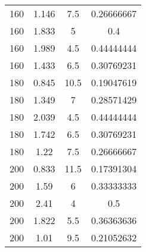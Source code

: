 \begin{table}[H]
\begin{tabular}{@{}cccc@{}}
    160           & 1.146     & 7.5                   & 0.26666667              \\
    160           & 1.833     & 5                     & 0.4                     \\
    160           & 1.989     & 4.5                   & 0.44444444              \\
    160           & 1.433     & 6.5                   & 0.30769231              \\
    180           & 0.845     & 10.5                  & 0.19047619              \\
    180           & 1.349     & 7                     & 0.28571429              \\
    180           & 2.039     & 4.5                   & 0.44444444              \\
    180           & 1.742     & 6.5                   & 0.30769231              \\
    180           & 1.22      & 7.5                   & 0.26666667              \\
    200           & 0.833     & 11.5                  & 0.17391304              \\
    200           & 1.59      & 6                     & 0.33333333              \\
    200           & 2.41      & 4                     & 0.5                     \\
    200           & 1.822     & 5.5                   & 0.36363636              \\
    200           & 1.01      & 9.5                   & 0.21052632              \\ \bottomrule
    \end{tabular}
    \end{table}

